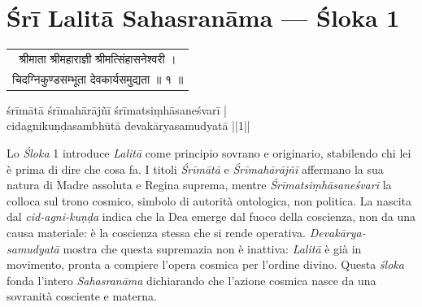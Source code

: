 \chapter*{Śrī Lalitā Sahasranāma — Śloka 1}

\begin{sloka}
{\sanskritfont
\begin{tabular}{c}
श्रीमाता श्रीमहाराज्ञी श्रीमत्सिंहासनेश्वरी ।\\
चिदग्निकुण्डसम्भूता देवकार्यसमुद्यता ॥ १ ॥
\end{tabular}

\vspace{1.5em}

{\middlesize \iastfont
śrīmātā śrīmahārājñī śrīmatsiṃhāsaneśvarī |\\
cidagnikuṇḍasambhūtā devakāryasamudyatā ||1||\\}

\vspace{1em}

{\middlesize
{}
}

\middlesize \iastfont {}

}
\end{sloka}


Lo \textit{Śloka} 1 introduce \textit{Lalitā} come principio sovrano e originario, stabilendo chi lei è prima di dire che cosa fa. I titoli \textit{Śrīmātā} e \textit{Śrīmahārājñī} affermano la sua natura di Madre assoluta e Regina suprema, mentre \textit{Śrīmatsiṃhāsaneśvarī} la colloca sul trono cosmico, simbolo di autorità ontologica, non politica. La nascita dal \textit{cid-agni-kuṇḍa} indica che la Dea emerge dal fuoco della coscienza, non da una causa materiale: è la coscienza stessa che si rende operativa. \textit{Devakārya-samudyatā} mostra che questa supremazia non è inattiva: \textit{Lalitā} è già in movimento, pronta a compiere l’opera cosmica per l’ordine divino. Questa \textit{śloka} fonda l’intero \textit{Sahasranāma} dichiarando che l’azione cosmica nasce da una sovranità cosciente e materna.

